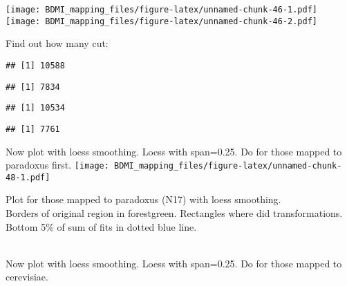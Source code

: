 \documentclass[
]{article}
\newenvironment{Shaded}{\begin{snugshade}}{\end{snugshade}}
\newcommand{\FunctionTok}[1]{\textcolor[rgb]{0.13,0.29,0.53}{\textbf{#1}}}
\newcommand{\NormalTok}[1]{#1}
\newcommand{\SpecialCharTok}[1]{\textcolor[rgb]{0.81,0.36,0.00}{\textbf{#1}}}
\begin{document}
\texttt{[image: BDMI\_mapping\_files/figure-latex/unnamed-chunk-46-1.pdf]}
\texttt{[image: BDMI\_mapping\_files/figure-latex/unnamed-chunk-46-2.pdf]}

Find out how many cut:

\begin{Shaded}
\end{Shaded}

\begin{verbatim}
## [1] 10588
\end{verbatim}

\begin{Shaded}
\end{Shaded}

\begin{verbatim}
## [1] 7834
\end{verbatim}

\begin{Shaded}
\end{Shaded}

\begin{verbatim}
## [1] 10534
\end{verbatim}

\begin{Shaded}
\end{Shaded}

\begin{verbatim}
## [1] 7761
\end{verbatim}

Now plot with loess smoothing. Loess with span=0.25. Do for those mapped
to paradoxus first.
\texttt{[image: BDMI\_mapping\_files/figure-latex/unnamed-chunk-48-1.pdf]}

Plot for those mapped to paradoxus (N17) with loess smoothing.\\
Borders of original region in forestgreen. Rectangles where did
transformations.\\
Bottom 5\% of sum of fits in dotted blue line.\\
\strut \\
Now plot with loess smoothing. Loess with span=0.25. Do for those mapped
to cerevisiae.
\end{document}
